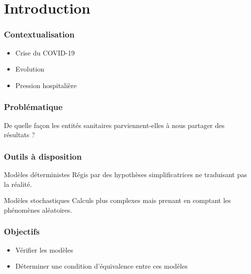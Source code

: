 \section{Introduction}

\begin{frame}
 	 \frametitle{Contextualisation}
	\begin{itemize}
			\item Crise du COVID-19
			\item Evolution
			\item Pression hospitalière
	\end{itemize}
\end{frame}


\begin{frame}
    \frametitle{Problématique}
	De quelle façon les entités sanitaires parviennent-elles à nous partager des résultats ?
\end{frame}


\begin{frame}
    \frametitle{Outils à disposition}

    \begin{block}{Modèles déterministes}
        Régis par des hypothèses simplificatrices ne traduisant pas la réalité.
    \end{block}


    \begin{block}{Modèles stochastiques}
        Calculs plus complexes mais prenant en comptant les phénomènes aléatoires.

    \end{block}
\end{frame}

\begin{frame}
    \frametitle{Objectifs}
     \begin{itemize}
    	\item Vérifier les modèles
	\item Déterminer une condition d'équivalence entre ces modèles 
     \end{itemize}
\end{frame}



